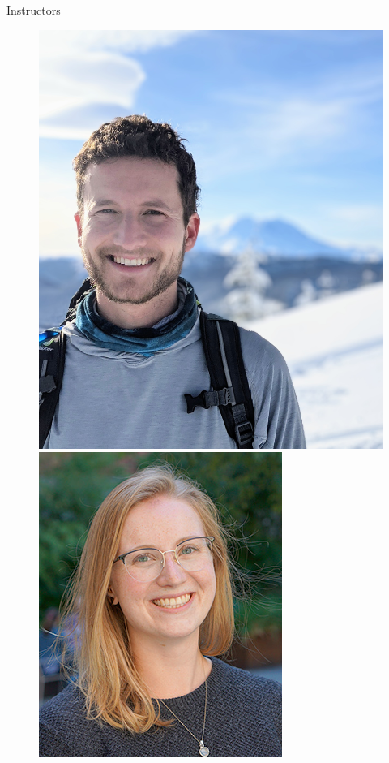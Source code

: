 \documentclass[10pt,t]{beamer}
\begin{document}
\begin{frame}{Instructors}
\begin{figure}
	\begin{center}
		\includegraphics[height=0.4\textheight]{charlie.jpg} 
		\hspace{2cm}
		\includegraphics[height=0.4\textheight]{taylor.jpg}
	\end{center}
\end{figure}


\end{frame}
\end{document}
